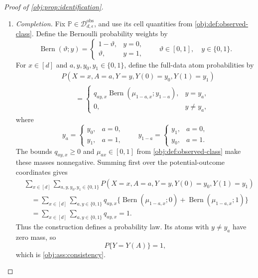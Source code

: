 \documentclass[11pt]{article}
\begin{document}
\begin{proof}[Proof of \cref{obj:prop:identification}]
\begin{enumerate}
\item \emph{Completion.}
Fix \(\mathbb P\in\mathcal D_{d,\epsilon}^{\mathrm{obs}}\), and use its cell quantities from \cref{obj:def:observed-class}. Define the Bernoulli probability weights by
\[
\operatorname{Bern}(\vartheta;y)
=
\begin{cases}
1-\vartheta,&y=0,\\
\vartheta,&y=1,
\end{cases}
\qquad
\vartheta\in[0,1],\quad y\in\{0,1\}.
\]
For \(x\in[d]\) and \(a,y,y_0,y_1\in\{0,1\}\), define the full-data atom probabilities by
\[
\begin{aligned}
&P(X=x,A=a,Y=y,Y(0)=y_0,Y(1)=y_1)\\
&\qquad=
\begin{cases}
q_{ay,x}\operatorname{Bern}(\mu_{1-a,x};y_{1-a}),&y=y_a,\\
0,&y\ne y_a,
\end{cases}
\end{aligned}
\]
where
\[
y_a=
\begin{cases}
y_0,&a=0,\\
y_1,&a=1,
\end{cases}
\qquad
y_{1-a}=
\begin{cases}
y_1,&a=0,\\
y_0,&a=1.
\end{cases}
\]
The bounds \(q_{ay,x}\ge0\) and \(\mu_{ax}\in[0,1]\) from \cref{obj:def:observed-class} make these masses nonnegative. Summing first over the potential-outcome coordinates gives
\[
\begin{aligned}
&\sum_{x\in[d]}\sum_{a,y,y_0,y_1\in\{0,1\}}
P(X=x,A=a,Y=y,Y(0)=y_0,Y(1)=y_1)\\
&\quad=
\sum_{x\in[d]}\sum_{a,y\in\{0,1\}}
q_{ay,x}
\bigl\{
\operatorname{Bern}(\mu_{1-a,x};0)
+\operatorname{Bern}(\mu_{1-a,x};1)
\bigr\}\\
&\quad=\sum_{x\in[d]}\sum_{a,y\in\{0,1\}}q_{ay,x}=1.
\end{aligned}
\]
Thus the construction defines a probability law. Its atoms with \(y\ne y_a\) have zero mass, so
\[
P\{Y=Y(A)\}=1,
\]
which is \cref{obj:ass:consistency}.


\end{enumerate}
\end{proof}
\end{document}
